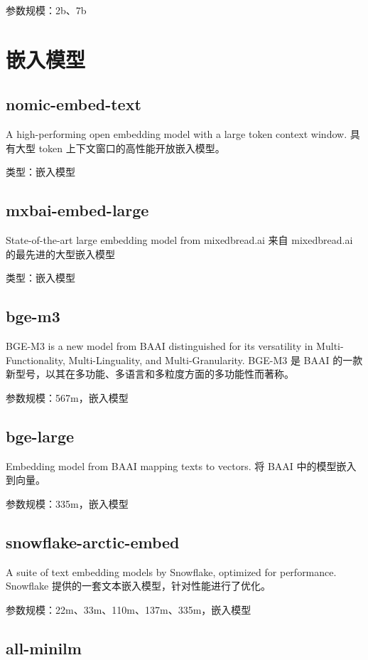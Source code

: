 \documentclass[12pt,UTF8]{ctexbook}
\begin{document}
参数规模：2b、7b

\chapter{嵌入模型}

\section{nomic-embed-text}

A high-performing open embedding model with a large token context window.
具有大型 token 上下文窗口的高性能开放嵌入模型。

类型：嵌入模型

\section{mxbai-embed-large}

State-of-the-art large embedding model from mixedbread.ai
来自 mixedbread.ai 的最先进的大型嵌入模型

类型：嵌入模型

\section{bge-m3}

BGE-M3 is a new model from BAAI distinguished for its versatility in Multi-Functionality, Multi-Linguality, and Multi-Granularity.
BGE-M3 是 BAAI 的一款新型号，以其在多功能、多语言和多粒度方面的多功能性而著称。

参数规模：567m，嵌入模型

\section{bge-large}

Embedding model from BAAI mapping texts to vectors.
将 BAAI 中的模型嵌入到向量。

参数规模：335m，嵌入模型

\section{snowflake-arctic-embed}

A suite of text embedding models by Snowflake, optimized for performance.
Snowflake 提供的一套文本嵌入模型，针对性能进行了优化。

参数规模：22m、33m、110m、137m、335m，嵌入模型

\section{all-minilm}
\end{document}

